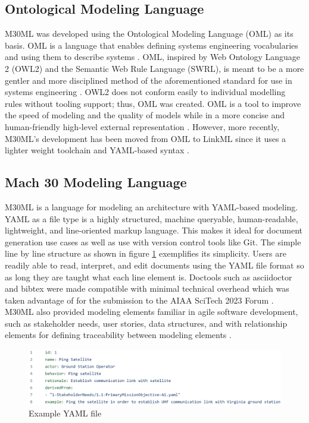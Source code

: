 \documentclass[journal,article,submit,pdftex,moreauthors]{Definitions/mdpi}
\begin{document}
\subsection{Ontological Modeling Language}
M30ML was developed using the Ontological Modeling Language (OML) as its basis.  OML is a language that enables defining systems engineering vocabularies and using them to describe systems \cite{oml_language}.  OML, inspired by Web Ontology Language 2 (OWL2) and the Semantic Web Rule Language (SWRL), is meant to be a more gentler and more disciplined method of the aforementioned standard for use in systems engineering \cite{oml_language}.  OWL2 does not conform easily to individual modelling rules without tooling support; thus, OML was created.  OML is a tool to improve the speed of modeling and the quality of models while in a more concise and human-friendly high-level external representation \cite{oml_origin_and_rationale}.  However, more recently, M30ML's development has been moved from OML to LinkML since it uses a lighter weight toolchain and YAML-based syntax \cite{linkml}.  

\subsection{Mach 30 Modeling Language}

M30ML is a language for modeling an architecture with YAML-based modeling.  YAML as a file type is a highly structured, machine queryable, human-readable, lightweight, and line-oriented markup language.  This makes it ideal for document generation use cases as well as use with version control tools like Git.  The simple line by line structure as shown in figure \ref{fig:example_yaml} exemplifies its simplicity.  Users are readily able to read, interpret, and edit documents using the YAML file format so as long they are taught what each line element is.  Doctools such as asciidoctor and bibtex were made compatible with minimal technical overhead which was taken advantage of for the submission to the AIAA SciTech 2023 Forum \cite{scitech_proceeding}.  M30ML also provided modeling elements familiar in agile software development, such as stakeholder needs, user stories, data structures, and with relationship elements for defining traceability between modeling elements \cite{mach30_git}.

\begin{figure}[H]
    \includegraphics[width=13.75 cm]{assets/user_story.png}
    \caption{Example YAML file}
	\label{fig:example_yaml}
    \end{figure}   
\unskip
\end{document}
